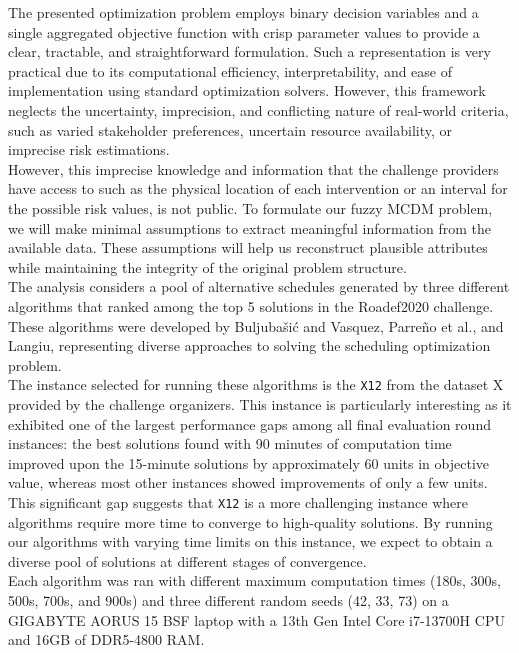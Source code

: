 The presented optimization problem employs binary decision variables and a single aggregated objective function with crisp parameter values to provide a clear, tractable, and straightforward formulation. Such a representation is very practical due to its computational efficiency, interpretability, and ease of implementation using standard optimization solvers. However, this framework neglects the uncertainty, imprecision, and conflicting nature of  real-world criteria, such as varied stakeholder preferences, uncertain resource availability, or imprecise risk estimations. \\

However, this imprecise knowledge and information that the challenge providers have access to such as the physical location of each intervention or an interval for the possible risk values, is not public. To formulate our fuzzy MCDM problem, we will make minimal assumptions to extract meaningful information from the available data. These assumptions will help us reconstruct plausible attributes while maintaining the integrity of the original problem structure.\\

The analysis considers a pool of alternative schedules generated by three different algorithms that ranked among the top 5 solutions in the Roadef2020 challenge. These algorithms were developed by Buljubašić
and Vasquez\cite{top1}, Parreño et al.\cite{ConsueloRoadef}, and Langiu\cite{top5}, representing diverse approaches to solving the scheduling optimization problem.\\

The instance selected for running these 
algorithms is the \texttt{X12} from the dataset 
X provided by the challenge organizers. This instance is particularly interesting as it exhibited one of the largest performance gaps among all final evaluation round instances: the best solutions found with 90 minutes of computation time improved upon the 15-minute solutions by approximately 60 units in objective value, whereas most other instances showed improvements of only a few units. This significant gap suggests that \texttt{X12} is a more challenging instance where algorithms require more time to converge to high-quality solutions. By running our algorithms with varying time limits on this instance, we expect to obtain a diverse pool of solutions at different stages of convergence.\\

Each algorithm was ran with different maximum computation times (180s, 300s, 500s, 700s, and 900s) and three different random seeds (42, 33, 73) on a GIGABYTE AORUS 15 BSF laptop with a 13th Gen Intel Core i7-13700H CPU and 16GB of DDR5-4800 RAM.\\


